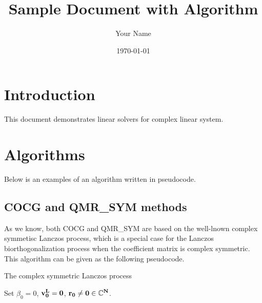\documentclass{article}
\begin{document}
\title{Sample Document with Algorithm}
\author{Your Name}
\date{\today}
\maketitle

\section{Introduction}
This document demonstrates linear solvers for complex linear system.

\section{Algorithms}
Below is an examples of an algorithm written in pseudocode.

\subsection{COCG and QMR\_SYM methods}

As we know, both COCG and QMR\_SYM are based on the well-lnown complex symmetisc Lanczos process, which is a special case for the Lanczos biorthogonalization process when the coefficient matrix is complex symmetric. This algorithm can be given as the following pseudocode.
\begin{algorithm}
\caption{The complex symmetric Lanczos process}
\begin{algorithmic}[1]
\State Set $\beta_0=0$, $\bf{v}^L_{0} = \bf{0}$, $\bf{r}_0 \neq \bf{0} \in \mathbb{C}^{N}$. 
\end{algorithmic}
\end{algorithm}
\end{document}
